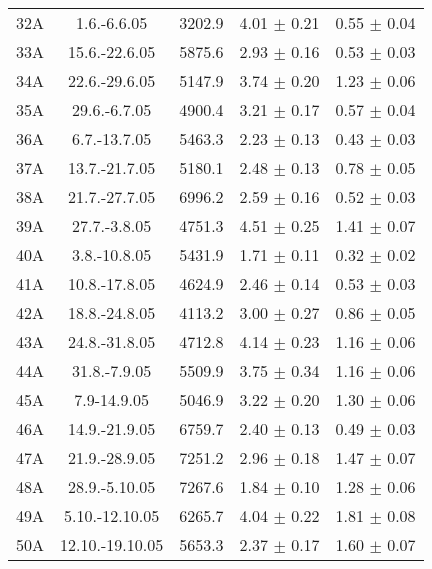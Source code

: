 \documentclass[a4paper,12pt]{article}
\begin{document}
\begin{center}
\begin{longtable}{|c|c|c|c|c|}
    32A &       1.6.-6.6.05     &       3202.9  &       4.01 $\pm$ 0.21 &       0.55 $\pm$ 0.04 \\
    33A &       15.6.-22.6.05   &       5875.6  &       2.93 $\pm$ 0.16 &       0.53 $\pm$ 0.03 \\
    34A &       22.6.-29.6.05   &       5147.9  &       3.74 $\pm$ 0.20 &       1.23 $\pm$ 0.06 \\
    35A &       29.6.-6.7.05    &       4900.4  &       3.21 $\pm$ 0.17 &       0.57 $\pm$ 0.04 \\
    36A &       6.7.-13.7.05    &       5463.3  &       2.23 $\pm$ 0.13 &       0.43 $\pm$ 0.03 \\
    37A &       13.7.-21.7.05   &       5180.1  &       2.48 $\pm$ 0.13 &       0.78 $\pm$ 0.05 \\
    38A &       21.7.-27.7.05   &       6996.2  &       2.59 $\pm$ 0.16 &       0.52 $\pm$ 0.03 \\
    39A &       27.7.-3.8.05    &       4751.3  &       4.51 $\pm$ 0.25 &       1.41 $\pm$ 0.07 \\
    40A &       3.8.-10.8.05    &       5431.9  &       1.71 $\pm$ 0.11 &       0.32 $\pm$ 0.02 \\
    41A &       10.8.-17.8.05   &       4624.9  &       2.46 $\pm$ 0.14 &       0.53 $\pm$ 0.03 \\
    42A &       18.8.-24.8.05   &       4113.2  &       3.00 $\pm$ 0.27 &       0.86 $\pm$ 0.05 \\
    43A &       24.8.-31.8.05   &       4712.8  &       4.14 $\pm$ 0.23 &       1.16 $\pm$ 0.06 \\
    44A &       31.8.-7.9.05    &       5509.9  &       3.75 $\pm$ 0.34 &       1.16 $\pm$ 0.06 \\
    45A &       7.9-14.9.05     &       5046.9  &       3.22 $\pm$ 0.20 &       1.30 $\pm$ 0.06 \\
    46A &       14.9.-21.9.05   &       6759.7  &       2.40 $\pm$ 0.13 &       0.49 $\pm$ 0.03 \\
    47A &       21.9.-28.9.05   &       7251.2  &       2.96 $\pm$ 0.18 &       1.47 $\pm$ 0.07 \\
    48A &       28.9.-5.10.05   &       7267.6  &       1.84 $\pm$ 0.10 &       1.28 $\pm$ 0.06 \\
    49A &       5.10.-12.10.05  &       6265.7  &       4.04 $\pm$ 0.22 &       1.81 $\pm$ 0.08 \\
    50A &       12.10.-19.10.05 &       5653.3  &       2.37 $\pm$ 0.17 &       1.60 $\pm$ 0.07 \\

\end{longtable}
\end{center}
\end{document}
